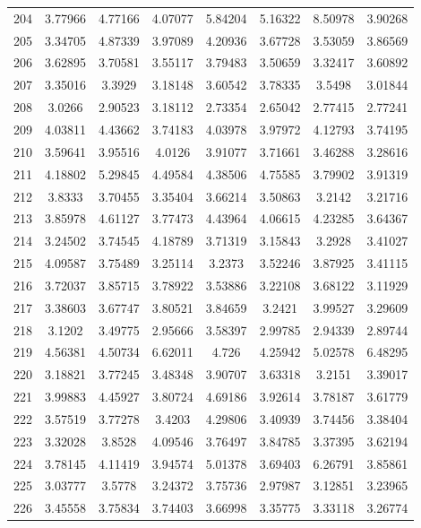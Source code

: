 \begin{center}
\begin{longtable}{cccccccc}
204 & 3.77966 & 4.77166 & 4.07077 & 5.84204 & 5.16322 & 8.50978 & 3.90268\\
205 & 3.34705 & 4.87339 & 3.97089 & 4.20936 & 3.67728 & 3.53059 & 3.86569\\
206 & 3.62895 & 3.70581 & 3.55117 & 3.79483 & 3.50659 & 3.32417 & 3.60892\\
207 & 3.35016 & 3.3929 & 3.18148 & 3.60542 & 3.78335 & 3.5498 & 3.01844\\
208 & 3.0266 & 2.90523 & 3.18112 & 2.73354 & 2.65042 & 2.77415 & 2.77241\\
209 & 4.03811 & 4.43662 & 3.74183 & 4.03978 & 3.97972 & 4.12793 & 3.74195\\
210 & 3.59641 & 3.95516 & 4.0126 & 3.91077 & 3.71661 & 3.46288 & 3.28616\\
211 & 4.18802 & 5.29845 & 4.49584 & 4.38506 & 4.75585 & 3.79902 & 3.91319\\
212 & 3.8333 & 3.70455 & 3.35404 & 3.66214 & 3.50863 & 3.2142 & 3.21716\\
213 & 3.85978 & 4.61127 & 3.77473 & 4.43964 & 4.06615 & 4.23285 & 3.64367\\
214 & 3.24502 & 3.74545 & 4.18789 & 3.71319 & 3.15843 & 3.2928 & 3.41027\\
215 & 4.09587 & 3.75489 & 3.25114 & 3.2373 & 3.52246 & 3.87925 & 3.41115\\
216 & 3.72037 & 3.85715 & 3.78922 & 3.53886 & 3.22108 & 3.68122 & 3.11929\\
217 & 3.38603 & 3.67747 & 3.80521 & 3.84659 & 3.2421 & 3.99527 & 3.29609\\
218 & 3.1202 & 3.49775 & 2.95666 & 3.58397 & 2.99785 & 2.94339 & 2.89744\\
219 & 4.56381 & 4.50734 & 6.62011 & 4.726 & 4.25942 & 5.02578 & 6.48295\\
220 & 3.18821 & 3.77245 & 3.48348 & 3.90707 & 3.63318 & 3.2151 & 3.39017\\
221 & 3.99883 & 4.45927 & 3.80724 & 4.69186 & 3.92614 & 3.78187 & 3.61779\\
222 & 3.57519 & 3.77278 & 3.4203 & 4.29806 & 3.40939 & 3.74456 & 3.38404\\
223 & 3.32028 & 3.8528 & 4.09546 & 3.76497 & 3.84785 & 3.37395 & 3.62194\\
224 & 3.78145 & 4.11419 & 3.94574 & 5.01378 & 3.69403 & 6.26791 & 3.85861\\
225 & 3.03777 & 3.5778 & 3.24372 & 3.75736 & 2.97987 & 3.12851 & 3.23965\\
226 & 3.45558 & 3.75834 & 3.74403 & 3.66998 & 3.35775 & 3.33118 & 3.26774\\

\end{longtable}
\end{center}
